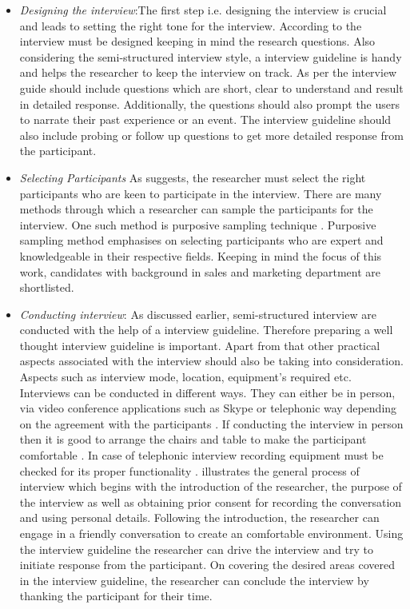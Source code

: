 \begin{itemize}
    \item \textit{Designing the interview}:The first step i.e. designing the interview is crucial and leads to setting the right tone for the interview. According to \textcite[59]{demarrais2004qualitative} the interview must be designed keeping in mind the research questions. Also considering the semi-structured interview style, a interview guideline is handy and helps the researcher to keep the interview on track. As per \textcite[61]{demarrais2004qualitative} the interview guide should include questions which are short, clear to understand and result in detailed response. Additionally, the questions should also prompt the users to narrate their past experience or an event. The interview guideline should also include probing or follow up questions to get more detailed response from the participant.
    
    \item \textit{Selecting Participants}
    As \textcite[68]{fylan2005semi} suggests, the researcher must select the right participants who are keen to participate in the interview. There are many methods through which a researcher can sample the participants for the interview. One such method is purposive sampling technique \autocite[68]{fylan2005semi}. Purposive sampling method emphasises on selecting participants who are expert and knowledgeable in their respective fields. Keeping in mind the focus of this work, candidates with background in sales and marketing department are shortlisted. 
    
    \item \textit{Conducting interview}: As discussed earlier, semi-structured interview are conducted with the help of a interview guideline. Therefore preparing a well thought interview guideline is important. Apart from that other practical aspects associated with the interview should also be taking into consideration. Aspects such as interview mode, location, equipment's required etc. Interviews can be conducted in different ways. They can either be in person, via video conference applications such as Skype or telephonic way depending on the agreement with the participants \autocite[248]{luo2009semistructured}. If conducting the interview in person then it is good to arrange the chairs and table to make the participant comfortable \autocite[69]{fylan2005semi}. In case of telephonic interview recording equipment must be checked for its proper functionality \autocite[69]{fylan2005semi}. \textcite[252]{luo2009semistructured} illustrates the general process of interview which begins with the introduction of the researcher, the purpose of the interview as well as obtaining prior consent for recording the conversation and using personal details. Following the introduction, the researcher can engage in a friendly conversation to create an comfortable environment. Using the interview guideline the researcher can drive the interview and try to initiate response from the participant. On covering the desired areas covered in the interview guideline, the researcher can conclude the interview by thanking the participant for their time.
    

\end{itemize}

